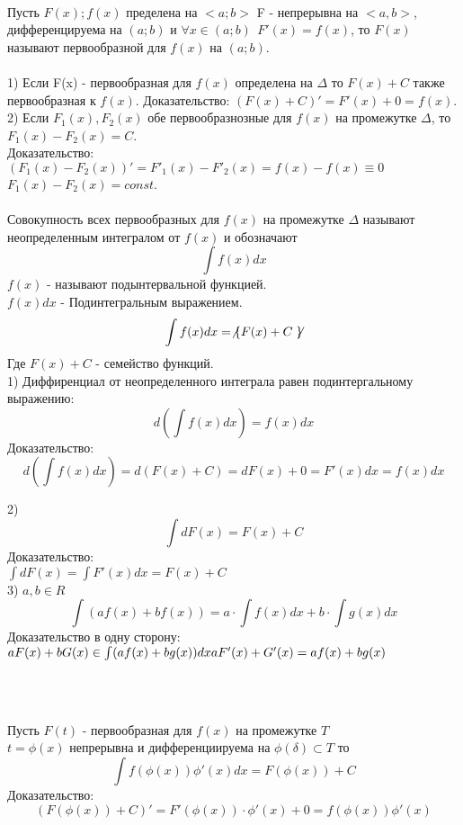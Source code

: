 \begin{center}
\end{center}

\\
Пусть $F(x); f(x)$ пределена на $<a;b>$ F - непрерывна на $<a,b>$,
дифференцируема на $(a;b)$ и $\forall x \in (a; b) ~~ F'(x) = f(x)$, то $F(x)$
называют первообразной для $f(x)$ на $(a;b)$.\\

\\
1) Если F(x) - первообразная для $f(x)$ определена на $\Delta$ то $F(x) + C$
также первообразная к $f(x)$.
Доказательство: $(F(x) + C)' = F'(x) + 0 = f(x)$.\\

2) Если $F_{1}(x), F_{2}(x)$ обе первообразнозные для $f(x)$ на промежутке
$\Delta$, то $F_{1}(x) - F_{2}(x) = C$.\\
Доказательство: $(F_{1}(x) - F_{2}(x))' = F'_{1}(x) - F'_{2}(x) =
f(x) - f(x) \equiv 0$\\
$F_{1}(x) - F_{2}(x) = const$.\\

\\
Совокупность всех первообразных для $f(x)$ на промежутке $\Delta$ называют
неопределенным интегралом от $f(x)$ и обозначают
\[\int f(x)dx\]
$f(x)$ - называют подынтервальной функцией.\\
$f(x)dx$ - Подинтегральным выражением.
\[\int f(x)dx = \not\{ F(x) + C \not\} \]
Где $F(x) + C$ - семейство функций.\\

1) Диффиренциал от неопределенного интеграла равен подинтергальному выражению:
\[d \left ( \int f(x)dx \right ) = f(x)dx \]
Доказательство:\\
\[d \left ( \int f(x)dx \right ) = d(F(x) + C) = dF(x) + 0 = F'(x)dx = f(x)dx\]

2)\[\int dF(x) = F(x) + C\]
Доказательство:\\
$\int dF(x) = \int F'(x)dx = F(x) + C$ \\

3) $a, b \in R$\\
\[\int (af(x) + bf(x)) = a \cdot \int f(x)dx + b \cdot \int g(x)dx\]
Доказательство в одну сторону:\\
$aF(x) + bG(x) \in \int (af(x) + bg(x))dx\\
aF'(x) + G'(x) = af(x) + bg(x)$ \\

\begin{center}
  \\
\end{center}
\\
Пусть $F(t)$ - первообразная для $f(x)$ на промежутке $T$ \\
$t = \phi (x)$ непрерывна и дифференциируема на $\phi(\delta) \subset T$ то\\
\[\int f(\phi (x)) \phi'(x)dx = F(\phi (x)) + C\]
Доказательство:
\[(F(\phi(x)) + C)' = F'(\phi (x)) \cdot \phi'(x) + 0 = f(\phi(x)) \phi'(x)\]\\